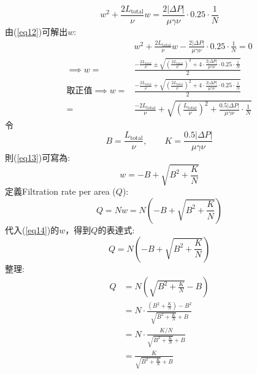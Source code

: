 \documentclass[12pt,a4paper]{article}
\begin{document}
\begin{problems}
\begin{enumerate}
\begin{equation}
      w^2 + \frac{2L_{\text{total}}}{\nu}w = \frac{2\left|\Delta P\right|}{\mu\gamma\nu}\cdot 0.25 \cdot \frac{1}{N} \label{eq12}
    \end{equation}
    由(\ref{eq12})可解出$w$:
    \begin{align}
      &w^2 + \frac{2L_{\text{total}}}{\nu}w - \frac{2\left|\Delta P\right|}{\mu\gamma\nu}\cdot 0.25 \cdot \frac{1}{N} = 0 \nonumber\\
      \implies w =& \frac{
      -\frac{2L_{\text{total}}}{\nu} \pm \sqrt{\left(\frac{2L_{\text{total}}}{\nu}\right)^2 + 4\cdot \frac{2\left|\Delta P\right|}{\mu\gamma\nu}\cdot 0.25 \cdot \frac{1}{N}}}{2} \nonumber\\
      \text{取正值}\implies w =& 
      \frac{-\frac{2L_{\text{total}}}{\nu} + \sqrt{\left(\frac{2L_{\text{total}}}{\nu}\right)^2 + 4\cdot \frac{2\left|\Delta P\right|}{\mu\gamma\nu}\cdot 0.25 \cdot \frac{1}{N}}}{2} \nonumber\\
      =& \frac{-2L_{\text{total}}}{\nu} + \sqrt{
        \left(\frac{L_{\text{total}}}{\nu}\right)^2 + \frac{0.5\left|\Delta P\right|}{\mu\gamma\nu}\cdot \frac{1}{N}
      } \label{eq13}
    \end{align}
    令
    \begin{equation}
      B = \frac{L_{\text{total}}}{\nu},\qquad K = \frac{0.5\left|\Delta P\right|}{\mu\gamma\nu}
    \end{equation}
    則(\ref{eq13})可寫為:
    \begin{equation}
      w = -B + \sqrt{B^2 + \frac{K}{N}} \label{eq14}
    \end{equation}
    定義Filtration rate per area ($Q$):
    \begin{equation}
      Q = Nw
      = N\left(-B + \sqrt{B^2 + \frac{K}{N}}\right)
    \end{equation}
    代入(\ref{eq14})的$w$，得到$Q$的表達式:
    \begin{equation}
      Q = N\left(-B + \sqrt{B^2 + \frac{K}{N}}\right) \label{eq15}
    \end{equation}
    整理:
    \begin{align}
      Q &= N\left(\sqrt{B^2+\frac{K}{N}}-B\right) \nonumber\\
        &= N\cdot\frac{\left(B^2+\frac{K}{N}\right)-B^2}{\sqrt{B^2+\frac{K}{N}}+B} \nonumber\\
        &= N\cdot\frac{K/N}{\sqrt{B^2+\frac{K}{N}}+B} \nonumber\\
        &= \frac{K}{\sqrt{B^2+\frac{K}{N}}+B}
    \end{align}

\end{enumerate}
\end{problems}
\end{document}
